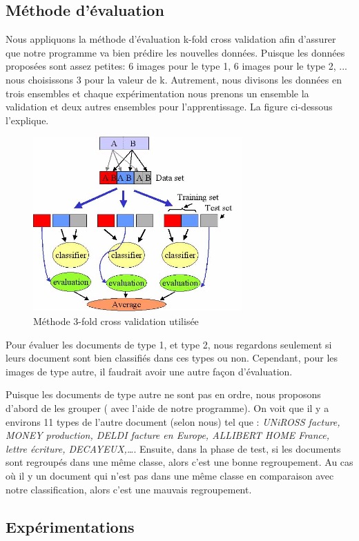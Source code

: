 \documentclass[french,12pt,a4paper,oneside,notitlepage]{report}
\begin{document}
\subsection{Méthode d'évaluation}
Nous appliquons la méthode d'évaluation k-fold cross validation afin d'assurer que notre 
programme va bien prédire les nouvelles données. Puisque les données proposées sont assez 
petites: 6 images pour le type 1, 6 images pour le type 2, ... nous choisissons 3 pour la 
valeur de k. Autrement, nous divisons les données en trois ensembles et chaque 
expérimentation nous prenons un ensemble  la validation et deux autres ensembles pour 
l'apprentissage. La figure ci-dessous l'explique.
\begin{figure}[ht]
	\begin{center}
	  \includegraphics[width=8cm]{3fold.jpg}
	\end{center}
	 \caption{Méthode 3-fold cross validation utilisée}
	 \label{fig: 3fold validation}
\end{figure}

Pour évaluer les documents de type 1, et type 2, nous regardons seulement si leurs document sont bien classifiés dans ces types ou non. Cependant, pour les images de type autre, il faudrait avoir une autre façon d'évaluation. 

Puisque les documents de type autre ne sont pas en ordre, nous proposons d'abord de les grouper ( avec l'aide de notre programme). On voit que il y a environs 11 types de l'autre document (selon nous) tel que : \textit{UNiROSS facture, MONEY production, DELDI facture en Europe, ALLIBERT HOME France, lettre écriture, DECAYEUX,\dots}. Ensuite, dans la phase de test, si les documents sont regroupés dans une même classe, alors c'est une bonne regroupement. Au cas où il y un document qui n'est pas dans une même classe en comparaison avec notre classification, alors c'est une mauvais regroupement.
\subsection{Expérimentations}
\end{document}
